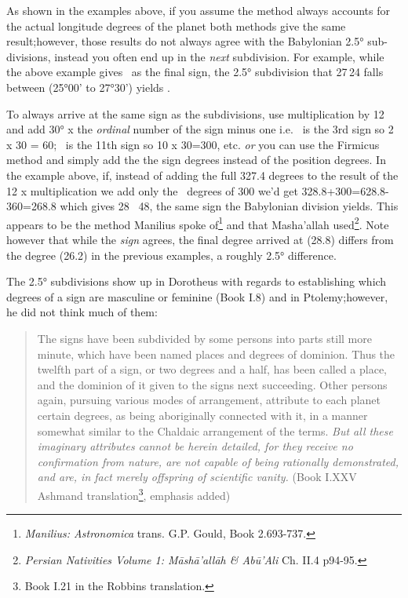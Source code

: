 As shown in the examples above, if you assume the method always accounts for the actual longitude degrees of the planet both methods give the same result;however, those results do not always agree with the Babylonian 2.5° sub-divisions, instead you often end up in the \textsl{next} subdivision. For example, while the above example gives \Capricorn\, as the final sign, the 2.5° subdivision that 27\Aquarius\,24 falls between (25°00' to 27°30') yields \Sagittarius.  

To always arrive at the same sign as the subdivisions, use multiplication by 12 and add 30° x the \textsl{ordinal} number of the sign minus one i.e. \Gemini\, is the 3rd sign so 2 x 30 = 60; \Aquarius\, is the 11th sign so 10 x 30=300, etc. \textsl{or} you can use the Firmicus method and simply add the the sign degrees instead of the position degrees. In the example above, if, instead of adding the full 327.4 degrees to the result of the 12 x multiplication we add only the \Aquarius\, degrees of 300 we'd get 328.8+300=628.8-360=268.8 which gives 28 \Sagittarius\, 48, the same sign the Babylonian division yields. This appears to be the method Manilius spoke of\footnote{\textsl{Manilius: Astronomica} trans. G.P. Gould, Book 2.693-737.} and that Masha'allah used\footnote{\textsl{Persian Nativities Volume 1: Māshā'allāh \& Abū'Ali} Ch. II.4 p94-95.}. Note however that while the \textsl{sign} agrees, the final degree arrived at (28.8) differs from the degree (26.2) in the previous examples, a roughly 2.5° difference.

The 2.5° subdivisions show up in Dorotheus with regards to establishing which degrees of a sign are masculine or feminine (Book I.8) and in Ptolemy;however, he did not think much of them:
\begin{quote}
The signs have been subdivided by some persons into parts still more minute, which have been named places and degrees of dominion. Thus the twelfth part of a sign, or two degrees and a half, has been called a place, and the dominion of it given to the signs next succeeding. Other persons again, pursuing various modes of arrangement, attribute to each planet certain degrees, as being aboriginally connected with it, in a manner somewhat similar to the Chaldaic arrangement of the terms. \textsl{But all these imaginary attributes cannot be herein detailed, for they receive no confirmation from nature, are not capable of being rationally demonstrated, and are, in fact merely offspring of scientific vanity.} (Book I.XXV Ashmand translation\footnote{Book I.21 in the Robbins translation.}, emphasis added)
\end{quote}

